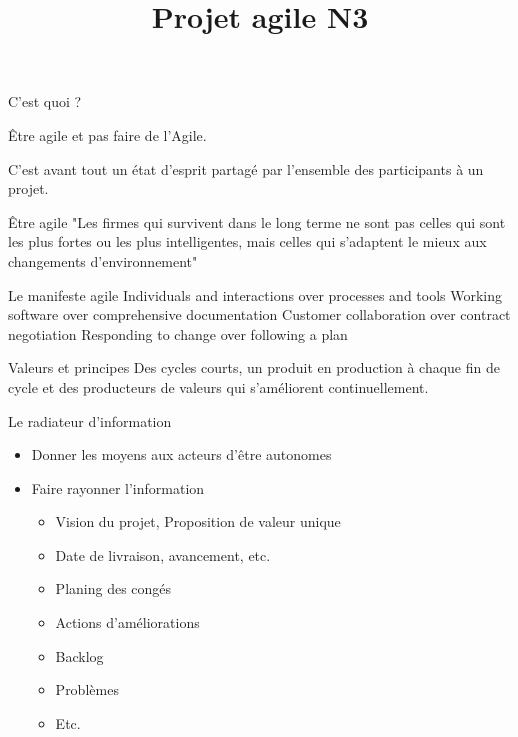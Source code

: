 \documentclass{beamer}
\title{Projet agile N3}
\author{
}
\date{}
\begin{document}
\frame{\titlepage}


\begin{frame}{C'est quoi ?}
 
  {\Large \alert{Être agile} et pas faire de l'Agile.}

  \vspace{6mm}
  C'est avant tout un état d'esprit partagé par l'ensemble des participants à un projet.
\end{frame}

\begin{frame}{Être agile}
  "Les firmes qui survivent dans le long terme ne sont pas celles qui sont les plus fortes ou les plus intelligentes, mais celles qui s'adaptent le mieux aux changements d'environnement"


\end{frame}

\begin{frame}{Le manifeste agile}
  \large
  \alert{Individuals and interactions} over processes and tools\newline
  \alert{Working software} over comprehensive documentation\newline
  \alert{Customer collaboration} over contract negotiation\newline
  \alert{Responding to change} over following a plan
\end{frame}

\begin{frame}{Valeurs et principes}
  \Large Des cycles courts, un produit en production à chaque fin de cycle et des producteurs de valeurs qui s'améliorent continuellement.
\end{frame}

\begin{frame}{Le radiateur d'information}
  \begin{itemize}
    \item Donner les moyens aux acteurs d'être autonomes
    \item Faire rayonner l'information
    
    \begin{itemize}
      \item Vision du projet, Proposition de valeur unique
      \item Date de livraison, avancement, etc.
      \item Planing des congés
      \item Actions d'améliorations
      \item Backlog
      \item Problèmes
      \item Etc.
    \end{itemize}
  \end{itemize}
\end{frame}
\end{document}
